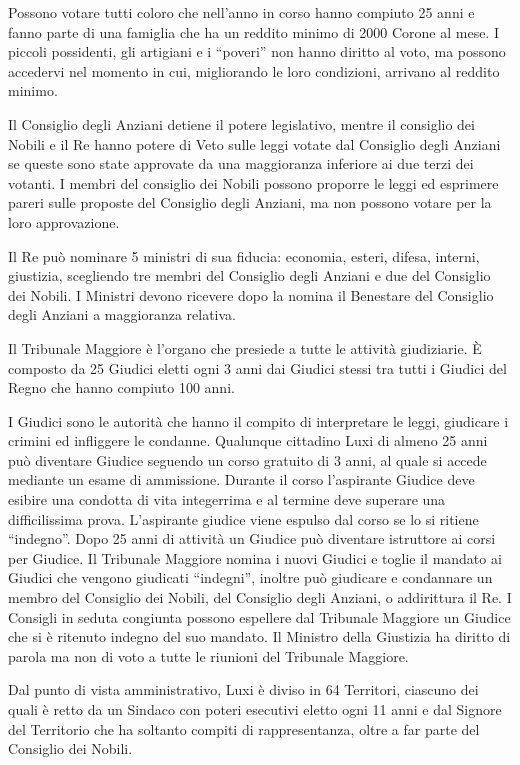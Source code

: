 Possono votare tutti coloro che nell'anno in corso hanno compiuto 25
anni e fanno parte di una famiglia che ha un reddito minimo di 2000
Corone al mese. I piccoli possidenti, gli artigiani e i ``poveri'' non
hanno diritto al voto, ma possono accedervi nel momento in cui,
migliorando le loro condizioni, arrivano al reddito minimo.

Il Consiglio degli Anziani detiene il potere legislativo, mentre il
consiglio dei Nobili e il Re hanno potere di Veto sulle leggi votate
dal Consiglio degli Anziani se queste sono state approvate da una
maggioranza inferiore ai due terzi dei votanti. I membri del consiglio
dei Nobili possono proporre le leggi ed esprimere pareri sulle
proposte del Consiglio degli Anziani, ma non possono votare per la
loro approvazione.

Il Re pu\`o nominare 5 ministri di sua fiducia: economia,
esteri, difesa, interni, giustizia, scegliendo tre membri del Consiglio degli
Anziani e due del Consiglio dei Nobili. I Ministri devono ricevere dopo la nomina
il Benestare del Consiglio degli Anziani a maggioranza relativa. 

Il Tribunale Maggiore \`e l'organo che presiede a tutte le
attivit\`a giudiziarie.  \`E composto da 25 Giudici eletti ogni 3
anni dai Giudici stessi tra tutti i Giudici del Regno che hanno
compiuto 100 anni. 

I Giudici sono le autorit\`a che hanno il compito
di interpretare le leggi, giudicare i crimini ed infliggere le
condanne. Qualunque cittadino Luxi di almeno 25 anni pu\`o diventare
Giudice seguendo un corso gratuito di 3 anni, al quale si accede
mediante un esame di ammissione. Durante il corso l'aspirante Giudice
deve esibire una condotta di vita integerrima e al termine deve
superare una difficilissima prova. L'aspirante giudice viene espulso
dal corso se lo si ritiene ``indegno''. Dopo 25 anni di attivit\`a
un Giudice pu\`o diventare istruttore ai corsi per Giudice.  Il
Tribunale Maggiore nomina i nuovi Giudici e toglie il mandato ai
Giudici che vengono giudicati ``indegni'', inoltre pu\`o giudicare e
condannare un membro del Consiglio dei Nobili, del Consiglio degli
Anziani, o addirittura il Re. I Consigli in seduta congiunta possono
espellere dal Tribunale Maggiore un Giudice che si \`e ritenuto
indegno del suo mandato. Il Ministro della Giustizia ha diritto di
parola ma non di voto a tutte le riunioni del Tribunale Maggiore. 

Dal punto di vista amministrativo, Luxi \`e diviso in 64 Territori,
ciascuno dei quali \`e retto da un Sindaco con poteri esecutivi
eletto ogni 11 anni e dal Signore del Territorio che ha soltanto
compiti di rappresentanza, oltre a far parte del Consiglio dei Nobili.

